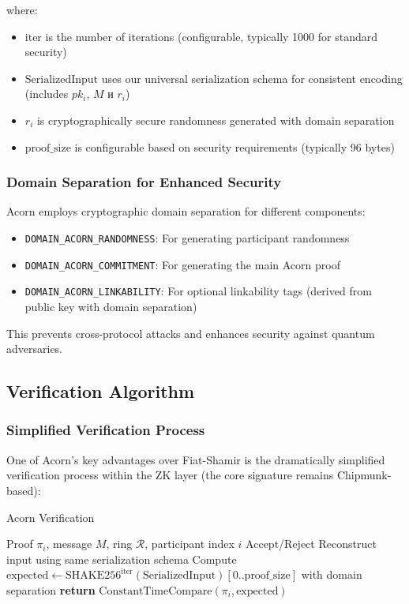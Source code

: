 \documentclass[11pt,a4paper]{article}
\begin{document}
where:
\begin{itemize}
\item $\text{iter}$ is the number of iterations (configurable, typically 1000 for standard security)
\item $\text{SerializedInput}$ uses our universal serialization schema for consistent encoding (includes $pk_i$, $M$ и $r_i$)
\item $r_i$ is cryptographically secure randomness generated with domain separation
\item $\text{proof\_size}$ is configurable based on security requirements (typically 96 bytes)
\end{itemize}

\subsubsection{Domain Separation for Enhanced Security}

Acorn employs cryptographic domain separation for different components:
\begin{itemize}
\item \texttt{DOMAIN\_ACORN\_RANDOMNESS}: For generating participant randomness
\item \texttt{DOMAIN\_ACORN\_COMMITMENT}: For generating the main Acorn proof
\item \texttt{DOMAIN\_ACORN\_LINKABILITY}: For optional linkability tags (derived from public key with domain separation)
\end{itemize}

This prevents cross-protocol attacks and enhances security against quantum adversaries.

\subsection{Verification Algorithm}

\subsubsection{Simplified Verification Process}

One of Acorn's key advantages over Fiat-Shamir is the dramatically simplified verification process within the ZK layer (the core signature remains Chipmunk-based):

\begin{algorithm}
\caption{Acorn Verification}
\begin{algorithmic}[1]
\REQUIRE Proof $\pi_i$, message $M$, ring $\mathcal{R}$, participant index $i$
\ENSURE Accept/Reject
\STATE Reconstruct input using same serialization schema
\STATE Compute $\text{expected} \leftarrow \text{SHAKE256}^{\text{iter}}(\text{SerializedInput})[0..\text{proof\_size}]$ with domain separation
\STATE \textbf{return} $\text{ConstantTimeCompare}(\pi_i, \text{expected})$
\end{algorithmic}
\end{algorithm}
\end{document}
